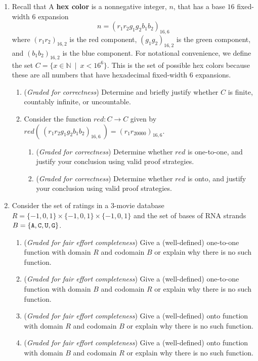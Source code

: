 \begin{enumerate}
   \item Recall that  A {\bf hex color} is a nonnegative
   integer, $n$, that has a base $16$ fixed-width $6$ expansion
   $$n = (r_1r_2g_1g_2b_1b_2)_{16,6}$$ 
   where $(r_1r_2)_{16,2}$ is the red
   component, $(g_1g_2)_{16,2}$ is the green component, and $(b_1b_2)_{16,2}$ is the
   blue component.   For notational convenience, we define the set 
   $C = \{ x \in \mathbb{N} ~\mid~x  < 16^6 \}$.  This is the set of possible hex colors because these
   are all numbers that have hexadecimal fixed-width $6$ expansions. 
   \begin{enumerate}
    \item ({\it Graded for correctness}) Determine and briefly justify whether $C$ is finite, countably infinite, or uncountable.
    \item Consider the function $red: C \to C$ given by $red(~(r_1r_2g_1g_2b_1b_2)_{16,6}~) = (r_1r_20000)_{16,6}$.
        \begin{enumerate}
            \item ({\it Graded for correctness}) Determine whether $red$ is one-to-one, 
            and justify your conclusion using valid proof strategies.
            \item ({\it Graded for correctness}) Determine whether $red$ is onto, 
            and justify your conclusion using valid proof strategies.
        \end{enumerate}
   \end{enumerate}

    \item Consider the set of ratings in a 3-movie database 
    $R = \{ -1,0,1\} \times \{-1,0,1\} \times \{-1,0,1\}$ and the set of 
    bases of RNA strands $B = \{\texttt{A}, \texttt{C}, \texttt{U}, \texttt{G}\}$.
    \begin{enumerate}
        \item ({\it Graded for fair effort completeness}) Give a (well-defined) one-to-one function with domain $R$ and codomain $B$ or explain why there is no such function.
        \item ({\it Graded for fair effort completeness}) Give a (well-defined) one-to-one function with domain $B$ and codomain $R$ or explain why there is no such function.
        \item ({\it Graded for fair effort completeness}) Give a (well-defined) onto function with domain $R$ and codomain $B$ or explain why there is no such function.
        \item ({\it Graded for fair effort completeness}) Give a (well-defined) onto function with domain $B$ and codomain $R$ or explain why there is no such function.
    \end{enumerate}


\end{enumerate}
